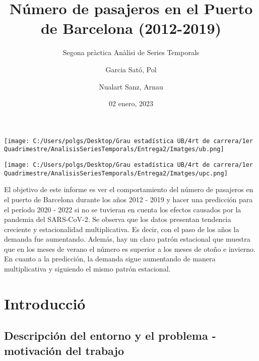 \documentclass[
]{article}
\title{Número de pasajeros en el Puerto de Barcelona (2012-2019)}
\subtitle{Segona pràctica Anàlisi de Series Temporals}
\author{Garcia Sató, Pol \and Nualart Sanz, Arnau}
\date{02 enero, 2023}
\begin{document}
\maketitle

\captionsetup{width=.75\textwidth}

\texttt{[image: C:/Users/polgs/Desktop/Grau estadística UB/4rt de carrera/1er Quadrimestre/AnalisisSeriesTemporals/Entrega2/Imatges/ub.png]}

\texttt{[image: C:/Users/polgs/Desktop/Grau estadística UB/4rt de carrera/1er Quadrimestre/AnalisisSeriesTemporals/Entrega2/Imatges/upc.png]}

\vspace{60mm}

\renewcommand{\contentsname}{Índex}
\renewcommand{\figurename}{Figura}
\renewcommand{\tablename}{Taula}

\begin{center}
El objetivo de este informe es ver el comportamiento del número de pasajeros en el puerto de Barcelona durante los años 2012 - 2019 y hacer una predicción para el período 2020 - 2022 si no se tuvieran en cuenta los efectos causados por la pandemia del SARS-CoV-2. 
Se observa que los datos presentan tendencia creciente y estacionalidad multiplicativa. Es decir, con el paso de los años la demanda fue aumentando. Además, hay un claro patrón estacional que muestra que en los meses de verano el número es superior a los meses de otoño e invierno. 
En cuanto a la predicción, la demanda sigue aumentando de manera multiplicativa y siguiendo el mismo patrón estacional. 
\end{center}

\newpage

\pagebreak

\tableofcontents

\pagebreak

\hypertarget{introducciuxf3}{%
\section{Introducció}\label{introducciuxf3}}

\hypertarget{descripciuxf3n-del-entorno-y-el-problema---motivaciuxf3n-del-trabajo}{%
\subsection{Descripción del entorno y el problema - motivación del
trabajo}\label{descripciuxf3n-del-entorno-y-el-problema---motivaciuxf3n-del-trabajo}}
\end{document}
